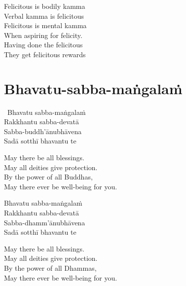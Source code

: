 \begin{english-verses}
  Felicitous is bodily kamma\\
  Verbal kamma is felicitous\\
  Felicitous is mental kamma\\
  When aspiring for felicity.\\
  Having done the felicitous\\
  They get felicitous rewards
\end{english-verses}

\suttaRef{[AN 3.155]}



\section{Bhavatu-sabba-maṅgalaṁ}
\label{bhavatu-sabba-mangalam'protective}

\begin{pali-hangtogether}
  \anglebracketleft\ \hspace{-0.5mm}Bhavatu sabba-maṅgalaṁ \hspace{-0.5mm}\anglebracketright\ \\
  Rakkhantu sabba-devatā\\
  Sabba-buddh'ānubhāvena\\
  Sadā sotthī bhavantu te
\end{pali-hangtogether}

\begin{english-verses}
  May there be all blessings.\\
  May all deities give protection.\\
  By the power of all Buddhas,\\
  May there ever be well-being for you.
\end{english-verses}

\begin{pali-hang-continued}
  Bhavatu sabba-maṅgalaṁ\\
  Rakkhantu sabba-devatā\\
  Sabba-dhamm'ānubhāvena\\
  Sadā sotthī bhavantu te
\end{pali-hang-continued}

\begin{english-verses}
  May there be all blessings.\\
  May all deities give protection.\\
  By the power of all Dhammas,\\
  May there ever be well-being for you.
\end{english-verses}

